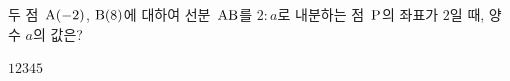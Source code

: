 두 점~$\mathrm{A}(-2)$, $\mathrm{B}(8)$에 대하여 선분~$\mathrm{AB}$를 $2:a$로 내분하는 점~$\mathrm{P}$의 좌표가 $2$일 때, 양수 $a$의 값은?
\begin{choices32}{$1$}{$2$}{$3$}{$4$}{$5$}\end{choices32}
